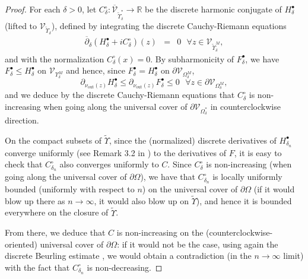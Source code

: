 \documentclass[oneside,english]{amsart}
\numberwithin{equation}{section}
\numberwithin{figure}{section}
\theoremstyle{plain}
\theoremstyle{plain}
\theoremstyle{plain}
\theoremstyle{plain}
\theoremstyle{plain}
\theoremstyle{definition}
\theoremstyle{remark}
\begin{document}
\begin{proof}
For each $\delta>0$, let $C_{\delta}^{\circ}:\overline{\mathcal{V}}_{\tilde{\Upsilon}_{\delta}^{*}}\to\mathbb{R}$
be the discrete harmonic conjugate of $H_{\delta}^{\bullet}$ (lifted
to $\mathcal{V}_{\tilde{\Upsilon}_{\delta}}$), defined by integrating
the discrete Cauchy-Riemann equations 
\begin{eqnarray*}
\overline{\partial}_{\delta}\left(H_{\delta}^{\bullet}+iC_{\delta}^{\circ}\right)\left(z\right) & = & 0\,\,\,\,\forall z\in\mathcal{V}_{\tilde{\Upsilon}_{\delta}^{M}},
\end{eqnarray*}
and with the normalization $C_{\delta}^{\circ}\left(x\right)=0$.
By subharmonicity of $F_{\delta}^{\bullet}$, we have $F_{\delta}^{\bullet}\leq H_{\delta}^{\bullet}$
on $\mathcal{V}_{\Upsilon_{\delta}^{M}}$ and hence, since $F_{\delta}^{\bullet}=H_{\delta}^{\bullet}$
on $\partial\mathcal{V}_{\Omega_{\delta}^{M}}$, 
\[
\partial_{\nu_{\mathrm{out}}\left(z\right)}H_{\delta}^{\bullet}\leq\partial_{\nu_{\mathrm{out}}\left(z\right)}F_{\delta}^{\bullet}\leq0\,\,\,\,\forall z\in\partial\mathcal{V}_{\Omega_{\delta}^{M}},
\]
and we deduce by the discrete Cauchy-Riemann equations that $C_{\delta}^{\circ}$
is non-increasing when going along the universal cover of $\partial\mathcal{V}_{\Omega_{\delta}^{*}}$
in counterclockwise direction. 

On the compact subsets of $\tilde{\Upsilon}$, since the (normalized)
discrete derivatives of $H_{\delta_{n}}^{\bullet}$ converge uniformly
(see Remark 3.2 in \cite{chelkak-smirnov-i}) to the derivatives of
$F$, it is easy to check that $C_{\delta_{n}}^{\circ}$ also converges
uniformly to $C$. Since $C_{\delta}^{\circ}$ is non-increasing (when
going along the universal cover of $\partial\Omega$), we have that
$C_{\delta_{n}}^{\circ}$ is locally uniformly bounded (uniformly
with respect to $n$) on the universal cover of $\partial\Omega$
(if it would blow up there as $n\to\infty$, it would also blow up
on $\tilde{\Upsilon}$), and hence it is bounded everywhere on the
closure of $\tilde{\Upsilon}$. 

From there, we deduce that $C$ is non-increasing on the (counterclockwise-oriented)
universal cover of $\partial\Omega$: if it would not be the case,
using again the discrete Beurling estimate \cite{kesten}, we would
obtain a contradiction (in the $n\to\infty$ limit) with the fact
that $C_{\delta_{n}}^{\circ}$ is non-decreasing.
\end{proof}
\end{document}
